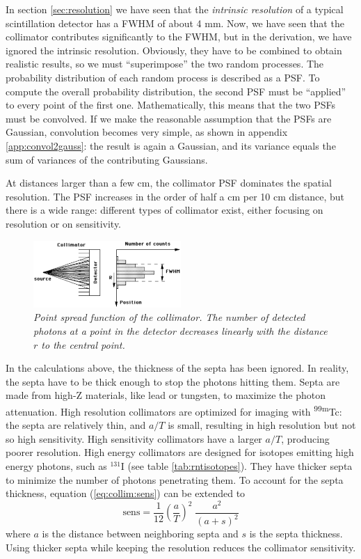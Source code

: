 \documentclass[11pt,oneside]{book}
\begin{document}
In section \ref{sec:resolution} we have seen that the {\em intrinsic
resolution} of a typical scintillation detector has a FWHM of about 4 mm. Now,
we have seen that the collimator contributes significantly to the FWHM, but in
the derivation, we have ignored the intrinsic resolution.  Obviously, they
have to be combined to obtain realistic results, so we must ``superimpose'' the
two random processes. The probability distribution of each random process is
described as a PSF. To compute the overall probability distribution, the
second PSF must be ``applied'' to every point of the first
one. Mathematically, this means that the two PSFs must be convolved. If we
make the reasonable assumption that the PSFs are Gaussian, convolution
becomes very simple, as shown in appendix \ref{app:convol2gauss}: the result
is again a Gaussian, and its variance equals the sum of variances of the
contributing Gaussians.

At distances larger than a few cm, the collimator PSF dominates the spatial
resolution. The PSF increases in the order of half a cm per 10 cm distance,
but there is a wide range: different types of collimator exist, either
focusing on resolution or on sensitivity.

%
\begin{figure}[tb]
\centering
\includegraphics[width=0.5\textwidth]{figs/fig_collimatorpsf.pdf}
\caption{\label{fig:collimatorpsf} \emph{Point spread function of
          the collimator. The number of detected photons at a point in the
          detector decreases linearly with the distance $r$ to the central
          point.}}
\end{figure}

In the calculations above, the thickness of the septa has been
ignored. In reality, the septa have to be thick enough to stop the
photons hitting them. Septa are made from high-Z materials, like lead
or tungsten, to maximize the photon attenuation. High resolution
collimators are optimized for imaging with \textsuperscript{99m}Tc: the septa are
relatively thin, and $a/T$ is small, resulting in high resolution but
not so high sensitivity. High sensitivity collimators have a larger
$a/T$, producing poorer resolution. High energy collimators are
designed for isotopes emitting high energy photons, such as $^{131}$I
(see table \ref{tab:rntisotopes}). They have thicker septa to
minimize the number of photons penetrating them. To account for
the septa thickness, equation (\ref{eq:collim:sens}) can be extended
to
\begin{equation}
  \mbox{sens} =  \frac{1}{12} \left( \frac{a}{T} \right)^2
                 \;\frac{a^2}{(a+s)^2}
\end{equation}
where $a$ is the distance between neighboring septa and $s$ is the septa
thickness. Using thicker septa while keeping the resolution reduces
the collimator sensitivity.
\end{document}
